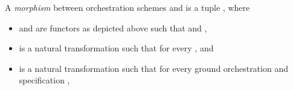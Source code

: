 \documentclass{LMCS}
\begin{document}
  \begin{defi}
    \label{definition:morphism-of-orchestration-schemes}
    A \emph{morphism} between orchestration schemes  and  is a tuple , where
    
    \begin{itemize}

    \item  and  are functors as depicted above such that  and ,

    \item  is a natural transformation  such that  for every , and
      
    \item  is a natural transformation  such that for every ground orchestration  and specification ,
      

    \end{itemize}
  \end{defi}
\end{document}
